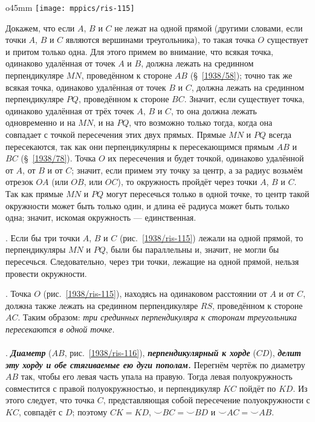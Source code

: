 \begin{wrapfigure}{o}{45mm}
\centering
\texttt{[image: mppics/ris-115]}
\caption{}\label{1938/ris-115}
\end{wrapfigure}

Докажем, что если $A$, $B$ и $C$ не лежат на одной прямой 
(другими словами, если точки $A$, $B$ и $C$ являются вершинами треугольника),
то такая точка $O$ существует и притом только одна.
Для этого примем во внимание, что всякая точка, одинаково удалённая от точек $A$ и $B$, должна лежать на срединном перпендикуляре $MN$, проведённом к стороне $AB$ (§~\ref{1938/58}); 
точно так же всякая точка, одинаково удалённая от точек $B$ и $C$, должна лежать на срединном перпендикуляре $PQ$, проведённом к стороне $BC$.
Значит, если существует точка, одинаково удалённая от трёх точек $A$, $B$ и $C$, то она должна лежать одновременно и на $MN$, и на $PQ$, что возможно только тогда, когда она совпадает с точкой пересечения этих двух прямых.
Прямые $MN$ и $PQ$ всегда пересекаются, так как они перпендикулярны к пересекающимся прямым $AB$ и $BC$ (§~\ref{1938/78}).
Точка $O$ их пересечения и будет точкой, одинаково удалённой от $A$, от $B$ и от $C$;
значит, если примем эту точку за центр, а за радиус возьмём отрезок $OA$ (или $OB$, или $OC$), то окружность пройдёт через точки $A$, $B$ и $C$.
Так как прямые $MN$ и $PQ$ могут пересечься только в одной точке, то центр такой окружности может быть только один, и длина её радиуса может быть только одна;
значит, искомая окружность — единственная.

\smallskip
{}.
Если бы три точки $A$, $B$ и $C$ (рис.~\ref{1938/ris-115}) лежали на одной прямой, то перпендикуляры $MN$ и $PQ$, были бы параллельны и, значит, не могли бы пересечься.
Следовательно, через три точки, лежащие на одной прямой, нельзя провести окружности.

\smallskip
{}.
Точка $O$ (рис.~\ref{1938/ris-115}), находясь на одинаковом расстоянии от $A$ и от $C$, должна также лежать на срединном перпендикуляре $RS$, проведённом к стороне $AC$. 
Таким образом:
\emph{три срединных перпендикуляра к сторонам треугольника пересекаются в одной точке.}

\paragraph{}\label{1938/105}
\mbox{.}
\textbf{\emph{Диаметр}} ($AB$, рис.~\ref{1938/ris-116}), \textbf{\emph{перпендикулярный к хорде}} ($CD$), \textbf{\emph{делит эту хорду и обе стягиваемые ею дуги пополам.}}
Перегнём чертёж по диаметру $AB$ так, чтобы его левая часть упала на правую.
Тогда левая полуокружность совместится с правой полуокружностью, и перпендикуляр $KC$ пойдёт по $KD$.
Из этого следует, что точка $C$, представляющая собой пересечение полуокружности с $KC$, совпадёт с $D$;
поэтому $CK=KD$,
${\smallsmile} BC={\smallsmile} BD$ и
${\smallsmile} AC={\smallsmile} AB$.

